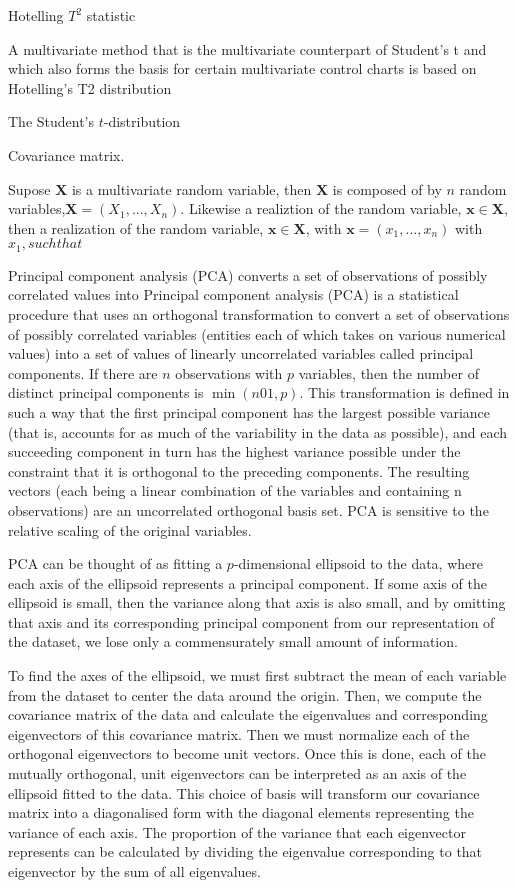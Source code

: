 Hotelling $T^2$ statistic

A multivariate method that is the multivariate counterpart of Student's t and which also forms the basis for certain multivariate control charts is based on Hotelling's T2 distribution\cite{hotelling1947_t2}

The Student's $t$-distribution

Covariance matrix.

Supose $\bm{X}$ is a multivariate random variable, then $\bm{X}$ is composed of by $n$ random variables,$\bm{X} = (X_1,...,X_n)$.  Likewise a realiztion of the random variable, $\bm{x} \in \bm{X}$, then a realization of the random variable, $\bm{x} \in \bm{X}$, with $\bm{x}=(x_1,...,x_n)$ with $x_1, such that $\in{}$

$

Principal component analysis (PCA)\cite{pearson1901_pca,hotelling1936_pca} converts a set of observations of possibly correlated values into
Principal component analysis (PCA) is a statistical procedure that uses an orthogonal transformation to convert a set of observations of possibly correlated variables (entities each of which takes on various numerical values) into a set of values of linearly uncorrelated variables called principal components. If there are $n$ observations with $p$ variables, then the number of distinct principal components is $\min(n01,p)$. This transformation is defined in such a way that the first principal component has the largest possible variance (that is, accounts for as much of the variability in the data as possible), and each succeeding component in turn has the highest variance possible under the constraint that it is orthogonal to the preceding components. The resulting vectors (each being a linear combination of the variables and containing n observations) are an uncorrelated orthogonal basis set. PCA is sensitive to the relative scaling of the original variables.

PCA can be thought of as fitting a $p$-dimensional ellipsoid to the data, where each axis of the ellipsoid represents a principal component. If some axis of the ellipsoid is small, then the variance along that axis is also small, and by omitting that axis and its corresponding principal component from our representation of the dataset, we lose only a commensurately small amount of information.

To find the axes of the ellipsoid, we must first subtract the mean of each variable from the dataset to center the data around the origin. Then, we compute the covariance matrix of the data and calculate the eigenvalues and corresponding eigenvectors of this covariance matrix. Then we must normalize each of the orthogonal eigenvectors to become unit vectors. Once this is done, each of the mutually orthogonal, unit eigenvectors can be interpreted as an axis of the ellipsoid fitted to the data. This choice of basis will transform our covariance matrix into a diagonalised form with the diagonal elements representing the variance of each axis. The proportion of the variance that each eigenvector represents can be calculated by dividing the eigenvalue corresponding to that eigenvector by the sum of all eigenvalues.
